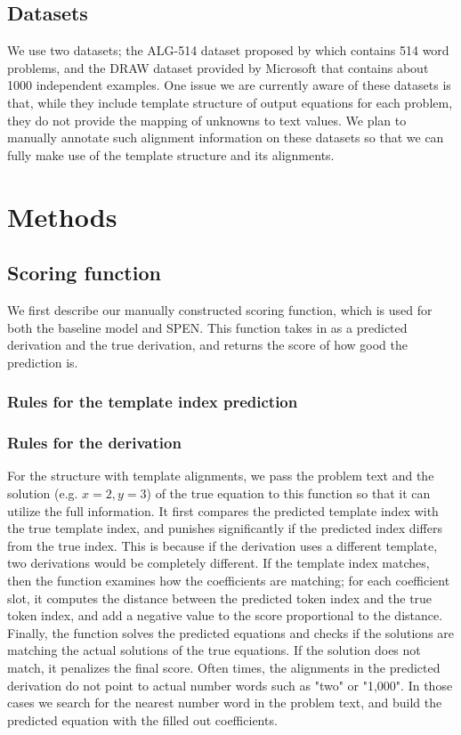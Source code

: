 \documentclass[11pt,letterpaper]{article}
\begin{document}
\subsection{Datasets}
We use two datasets; the ALG-514 dataset proposed by \cite{Kushman2014LearningTA} which contains 514 word problems, and the DRAW dataset provided by Microsoft that contains about 1000 independent examples. One issue we are currently aware of these datasets is that, while they include template structure of output equations for each problem, they do not provide the mapping of unknowns to text values. We plan to manually annotate such alignment information on these datasets so that we can fully make use of the template structure and its alignments.
\section{Methods}
\subsection{Scoring function}
We first describe our manually constructed scoring function, which is used for both the baseline model and SPEN. This function takes in as a predicted derivation and the true derivation, and returns the score of how good the prediction is.
\subsubsection{Rules for the template index prediction}

%
\subsubsection{Rules for the derivation}
For the structure with template alignments, we pass the problem text and the solution (e.g. $x=2, y=3$) of the true equation to this function so that it can utilize the full information. It first compares the predicted template index with the true template index, and punishes significantly if the predicted index differs from the true index. This is because if the derivation uses a different template, two derivations would be completely different. If the template index matches, then the function examines how the coefficients are matching; for each coefficient slot, it computes the distance between the predicted token index and the true token index, and add a negative value to the score proportional to the distance. Finally, the function solves the predicted equations and checks if the solutions are matching the actual solutions of the true equations. If the solution does not match, it penalizes the final score. Often times, the alignments in the predicted derivation do not point to actual number words such as "two" or "1,000". In those cases we search for the nearest number word in the problem text, and build the predicted equation with the filled out coefficients.
%
\end{document}
